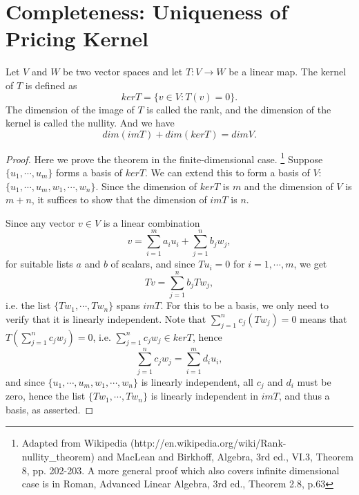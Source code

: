 \section{Completeness: Uniqueness of Pricing Kernel}

\begin{theorem} \label{T:rank}
Let $V$ and $W$ be two vector spaces and let $T:V\to W$ be a linear map. The
kernel of $T$ is defined as
\[
  ker T = \{v\in V: T(v)=0 \}.
\]
The dimension of the image of $T$ is called the rank, and the dimension of the
kernel is called the nullity. And we have
\[
  dim(im T) + dim(ker T) = dim V.
\]
\end{theorem}
\begin{proof}  %
Here we prove the theorem in the finite-dimensional case.
\footnote{Adapted from Wikipedia
    (http://en.wikipedia.org/wiki/Rank-nullity\_theorem) and
    MacLean and Birkhoff, Algebra, 3rd ed., VI.3, Theorem 8, pp. 202-203.
    A more general proof which also covers infinite dimensional case is in
    Roman, Advanced Linear Algebra, 3rd ed., Theorem 2.8, p.63}
Suppose $\{u_1,\cdots,u_m\}$ forms a basis of $ker T$. We can extend this to 
form a basis of $V$: $\{u_1,\cdots,u_m,w_1,\cdots,w_n\}$. Since the dimension
of $ker T$ is $m$ and the dimension of $V$ is $m+n$, it suffices to show that
the dimension of $im T$ is $n$.

Since any vector $v\in V$ is a linear combination
\[
  v = \sum_{i=1}^m a_i u_i + \sum_{j=1}^n b_j w_j,
\]
for suitable lists $a$ and $b$ of scalars, and since $Tu_i=0$ for 
$i=1,\cdots,m$, we get
\[
  Tv = \sum_{j=1}^n b_j Tw_j,
\]
i.e. the list $\{Tw_1,\cdots,Tw_n\}$ spans $im T$. For this to be a basis, we
only need to verify that it is linearly independent. Note that 
$\sum_{j=1}^n c_j (Tw_j)=0$ means that $T(\sum_{j=1}^n c_j w_j)=0$, i.e. 
$\sum_{j=1}^n c_j w_j\in ker T$, hence
\[
  \sum_{j=1}^n c_j w_j = \sum_{i=1}^m d_i u_i,
\]
and since $\{u_1,\cdots,u_m,w_1,\cdots,w_n\}$ is linearly independent,
all $c_j$ and $d_i$ must be zero, hence the list $\{Tw_1,\cdots,Tw_n\}$ 
is linearly independent in $im T$, and thus a basis, as asserted.
\end{proof}  %

